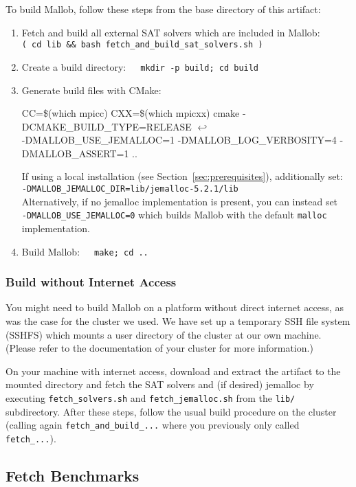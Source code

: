 \documentclass[runningheads]{article}
\newcommand{\CR}{{\tiny$\hookleftarrow$}}
\numberwithin{dummy}{subsection}
\begin{document}
To build Mallob, follow these steps from the base directory of this artifact:
\begin{enumerate}
 \item Fetch and build all external SAT solvers which are included in Mallob:\\
 \texttt{( cd lib \&\& bash fetch\_and\_build\_sat\_solvers.sh )}
 \item Create a build directory:\ \ \ \texttt{mkdir -p build; cd build}
 \item Generate build files with CMake:
 \begin{ttfenv}
 CC=\$(which mpicc) CXX=\$(which mpicxx) cmake -DCMAKE\_BUILD\_TYPE=RELEASE \CR\\
 -DMALLOB\_USE\_JEMALLOC=1 -DMALLOB\_LOG\_VERBOSITY=4 -DMALLOB\_ASSERT=1 ..
 \end{ttfenv}
 If using a local installation (see Section~\ref{sec:prerequisites}), additionally set:\\
 \texttt{-DMALLOB\_JEMALLOC\_DIR=lib/jemalloc-5.2.1/lib}\\
 Alternatively, if no jemalloc implementation is present, you can instead set\\
 \texttt{-DMALLOB\_USE\_JEMALLOC=0} which builds Mallob with the default \texttt{malloc} implementation.
 \item Build Mallob:\ \ \ \texttt{make; cd ..}
\end{enumerate}

\subsubsection{Build without Internet Access}

You might need to build Mallob on a platform without direct internet access, as was the case for the cluster we used.
We have set up a temporary SSH file system (SSHFS) which mounts a user directory of the cluster at our own machine.
(Please refer to the documentation of your cluster for more information.)

On your machine with internet access, download and extract the artifact to the mounted directory and fetch the SAT solvers and (if desired) jemalloc by executing \texttt{fetch\_solvers.sh} and \texttt{fetch\_jemalloc.sh} from the \texttt{lib/} subdirectory.
After these steps, follow the usual build procedure on the cluster (calling again \texttt{fetch\_and\_build\_...} where you previously only called \texttt{fetch\_...}).

\subsection{Fetch Benchmarks}
\end{document}
